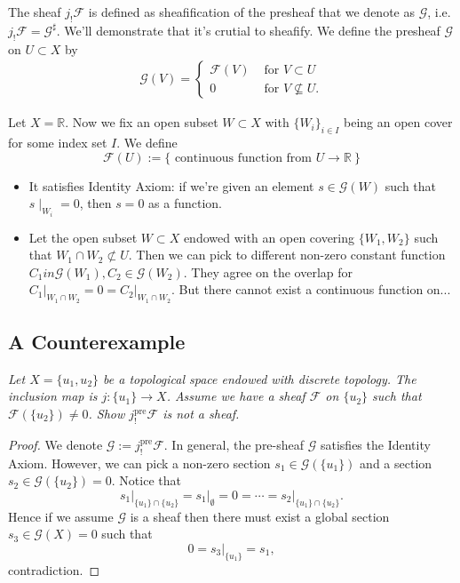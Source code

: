 The sheaf $j_{!}\mathscr F$ is defined as sheafification of the presheaf that we denote as $\mathscr G$, i.e. $j_{!}\mathscr F=\mathscr G^{\sharp}$. We'll demonstrate that it's crutial to sheafify. We define the presheaf $\mathscr G$ on $U\subset X$ by 
\begin{align*}
    \mathscr G(V)=\begin{cases}
        \mathscr F(V) & \text{ for } V\subset U \\
        0 & \text{ for } V\not\subseteq U.
    \end{cases}
\end{align*}

Let $X=\mathbb R$. 
Now we fix an open subset $W\subset X$ with $\{W_i\}_{i\in I}$ being an open cover for some index set $I$. We define 
\[\mathscr F(U):=\{\text{ continuous function from } U\to \mathbb R~\}\]

\begin{itemize}
    \item It satisfies Identity Axiom: if we're given an element $s\in \mathscr G(W)$ such that $s\mid_{W_i}=0$, then $s=0$ as a function.
    \item Let the open subset $W\subset X$ endowed with an open covering $\{W_1,W_2\}$ such that $W_1\cap W_2\not\subset U$. Then we can pick to different non-zero constant function $C_1
    in\mathscr G(W_1),C_2\in\mathscr G(W_2)$. They agree on the overlap for $C_1\vert_{W_1\cap W_2}=0=C_2\vert_{W_1\cap W_2}$. But there cannot exist a continuous function on... 
\end{itemize}

\subsection{A Counterexample}

\textit{Let $X=\{u_1,u_2\}$ be a topological space endowed with discrete topology. The inclusion map is $j:\{u_1\}\to X$. Assume we have a sheaf $\mathscr F$ on $\{u_2\}$ such that $\mathscr F(\{u_2\})\neq 0$. Show $j_{!}^{\text{pre}}\mathscr F$ is not a sheaf.}

\begin{proof}
    We denote $\mathscr G:=j_{!}^{\text{pre}}\mathscr F$.
    In general, the pre-sheaf $\mathscr G$ satisfies the Identity Axiom. However, we can pick a non-zero section $s_1\in\mathscr G(\{u_1\})$ and a section $s_2\in\mathscr G(\{u_2\})=0$. 
    Notice that 
    \[s_1\vert_{\{u_1\}\cap\{u_2\}}=s_1\vert_{\emptyset}=0=\cdots=s_2\vert_{\{u_1\}\cap\{u_2\}}.\] Hence if we assume $\mathscr G$ is a sheaf then there must exist a global section $s_3\in \mathscr G(X)=0$ such that 
    \[0=s_3\vert_{\{u_1\}}=s_1,\] contradiction.
\end{proof}


